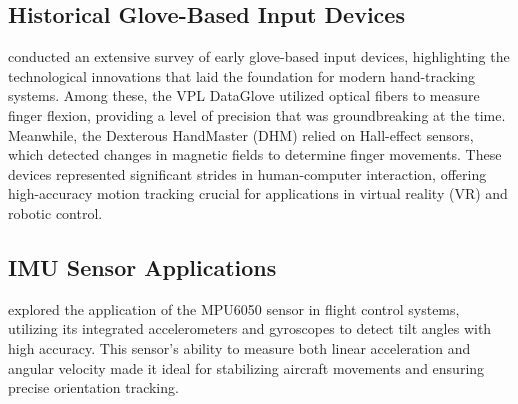 \subsection{Historical Glove-Based Input Devices}
\citet{Sturman1994} conducted an extensive survey of early glove-based input devices, highlighting the technological innovations that laid the foundation for modern hand-tracking systems. Among these, the VPL DataGlove utilized optical fibers to measure finger flexion, providing a level of precision that was groundbreaking at the time. Meanwhile, the Dexterous HandMaster (DHM) relied on Hall-effect sensors, which detected changes in magnetic fields to determine finger movements. These devices represented significant strides in human-computer interaction, offering high-accuracy motion tracking crucial for applications in virtual reality (VR) and robotic control.

\subsection{IMU Sensor Applications}
\citet{Huang2017} explored the application of the MPU6050 sensor in flight control systems, utilizing its integrated accelerometers and gyroscopes to detect tilt angles with high accuracy. This sensor's ability to measure both linear acceleration and angular velocity made it ideal for stabilizing aircraft movements and ensuring precise orientation tracking.